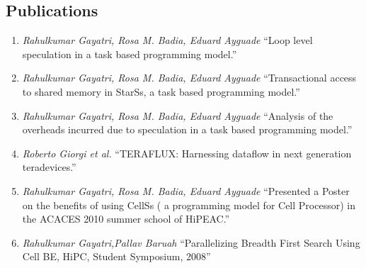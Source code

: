 \documentclass[margin]{res}
\begin{document}
\begin{resume}
\section{Publications}
%
\begin{enumerate}
	   \item \textit{Rahulkumar Gayatri, Rosa M. Badia, Eduard Ayguade}
			 \enquote{Loop level speculation in a task based programming model.} \\
%
	   \item \textit{Rahulkumar Gayatri, Rosa M. Badia, Eduard Ayguade}
			 \enquote{Transactional access to shared memory in StarSs, a task based programming model.} \\
%
	   \item \textit{Rahulkumar Gayatri, Rosa M. Badia, Eduard Ayguade} 
			 \enquote{Analysis of the overheads incurred due to speculation in a task based programming model.} \\
%
	   \item \textit{Roberto Giorgi et al.}
			 \enquote{TERAFLUX: Harnessing dataflow in next generation teradevices.} \\
%	   
	   \item \textit{Rahulkumar Gayatri, Rosa M. Badia, Eduard Ayguade} 
			 \enquote{Presented a Poster on the benefits of using CellSs ( a programming model for Cell Processor) in the ACACES 2010 summer school of HiPEAC.}
%	   
	   \item \textit{Rahulkumar Gayatri,Pallav Baruah} \enquote{Parallelizing Breadth First Search Using Cell BE, HiPC, Student Symposium, 2008}
%
\end {enumerate}
%

\end{resume}
\end{document}
